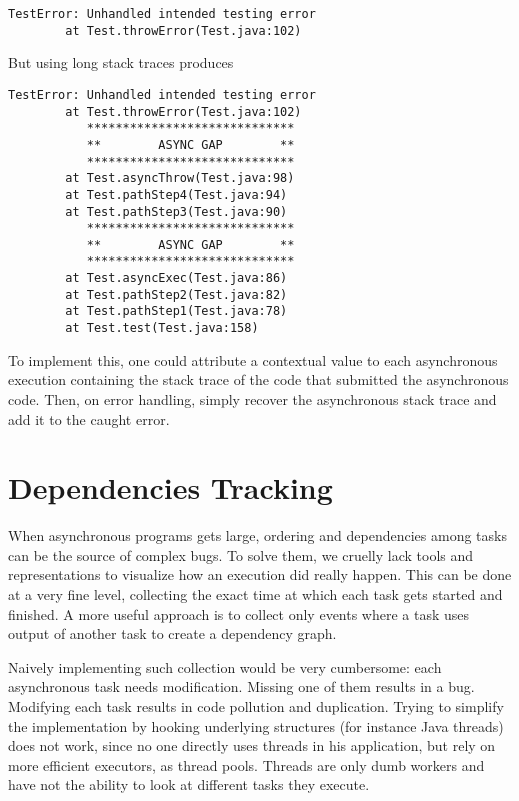 \begin{lstlisting}
TestError: Unhandled intended testing error
        at Test.throwError(Test.java:102)
\end{lstlisting}

But using long stack traces produces

\begin{lstlisting}
TestError: Unhandled intended testing error
        at Test.throwError(Test.java:102)
           *****************************
           **        ASYNC GAP        **
           *****************************
        at Test.asyncThrow(Test.java:98)
        at Test.pathStep4(Test.java:94)
        at Test.pathStep3(Test.java:90)
           *****************************
           **        ASYNC GAP        **
           *****************************
        at Test.asyncExec(Test.java:86)
        at Test.pathStep2(Test.java:82)
        at Test.pathStep1(Test.java:78)
        at Test.test(Test.java:158)
\end{lstlisting}


To implement this, one could attribute a contextual value to each asynchronous execution containing the stack trace of the code that submitted the asynchronous code. Then, on error handling, simply recover the asynchronous stack trace and add it to the caught error.

\section{Dependencies Tracking}

When asynchronous programs gets large, ordering and dependencies among tasks can be the source of complex bugs. To solve them, we cruelly lack tools and representations to visualize how an execution did really happen. This can be done at a very fine level, collecting the exact time at which each task gets started and finished. A more useful approach is to collect only events where a task uses output of another task to create a dependency graph.

Naively implementing such collection would be very cumbersome: each asynchronous task needs modification. Missing one of them results in a bug. Modifying each task results in code pollution and duplication. Trying to simplify the implementation by hooking underlying structures (for instance Java threads) does not work, since no one directly uses threads in his application, but rely on more efficient executors, as thread pools. Threads are only dumb workers and have not the ability to look at different tasks they execute.

